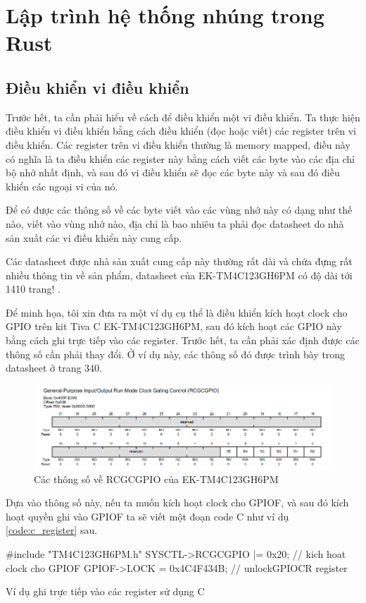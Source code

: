 \chapter{Lập trình hệ thống nhúng trong Rust}
\section{Điều khiển vi điều khiển}
Trước hết, ta cần phải hiểu về cách để điều khiển một vi điều khiển.
Ta thực hiện điều khiển vi điều khiển bằng cách điều khiển (đọc hoặc viết) các register trên vi điều khiển.
Các register trên vi điều khiển thường là memory mapped, điều này có nghĩa là ta điều khiển các register này bằng cách viết các byte vào các địa chỉ bộ nhớ nhất định, và sau đó vi điều khiển sẽ đọc các byte này và sau đó điều khiển các ngoại vi của nó.

Để có được các thông số về các byte viết vào các vùng nhớ này có dạng như thế nào, viết vào vùng nhớ nào, địa chỉ là bao nhiêu ta phải đọc datasheet do nhà sản xuất các vi điều khiển này cung cấp.

Các datasheet được nhà sản xuất cung cấp này thường rất dài và chứa đựng rất nhiều thông tin về sản phẩm, datasheet của EK-TM4C123GH6PM có độ dài tới 1410 trang! \cite{tivac_datasheet}.

Để minh họa, tôi xin đưa ra một ví dụ cụ thể là điều khiển kích hoạt clock cho GPIO trên kit Tiva C EK-TM4C123GH6PM, sau đó kích hoạt các GPIO này bằng cách ghi trực tiếp vào các register.
Trước hết, ta cần phải xác định được các thông số cần phải thay đổi. Ở ví dụ này, các thông số đó được trình bày trong datasheet ở trang 340.
\begin{figure}[ht]
\centering
\includegraphics[scale=0.5]{images/tivac_datasheet_example.png}
\caption{Các thông số về RCGCGPIO của EK-TM4C123GH6PM}
\end{figure}

Dựa vào thông số này, nếu ta muốn kích hoạt clock cho GPIOF, và sau đó kích hoạt quyền ghi vào GPIOF ta sẽ viết một đoạn code C như ví dụ \ref{code:c_register} sau.
\begin{listing}[ht]
\begin{ccode}
#include "TM4C123GH6PM.h"
SYSCTL->RCGCGPIO |= 0x20; // kich hoat clock cho GPIOF
GPIOF->LOCK = 0x4C4F434B; // unlockGPIOCR register
\end{ccode}
\caption{Ví dụ ghi trực tiếp vào các register sử dụng C}
\label{code:c_register}
\end{listing}

